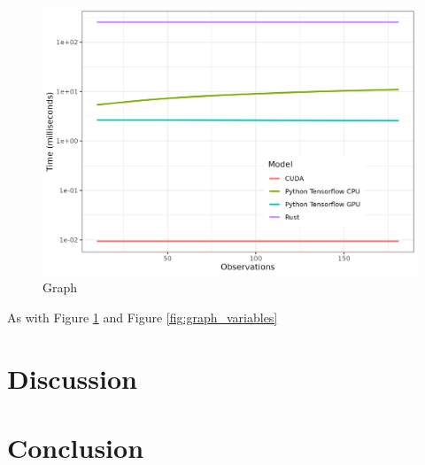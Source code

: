 \documentclass[12pt]{article}
\begin{document}
\begin{figure}[h]
	\begin{center}
		\includegraphics[width=\linewidth]{bootstraps.png}
	\end{center}
	\caption{Graph}
	\label{fig:graph_bootstraps}
\end{figure}

As with Figure \ref{fig:graph_bootstraps} and Figure \ref{fig:graph_variables}

\section{Discussion}


\section{Conclusion}

\newpage


\end{document}
